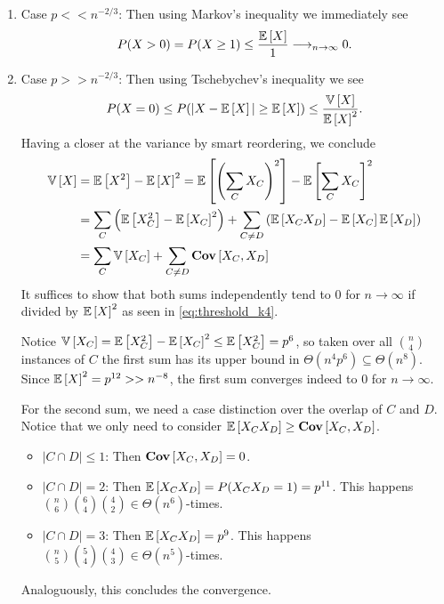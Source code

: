 \begin{enumerate}
    \item Case $p << n^{-2/3}$: Then using Markov's inequality we immediately see
          \begin{align}
              P(X > 0) = P(X \geq 1) \leq \frac{\mathbb{E}\left[X\right]}{1} \longrightarrow_{n \rightarrow \infty} 0.
          \end{align}
    \item Case $p >> n^{-2/3}$: Then using Tschebychev's inequality we see
          \begin{align}\label{eq:threshold_k4}
              P(X = 0) \leq P(|X - \mathbb{E}\left[X\right]| \geq \mathbb{E}\left[X\right]) \leq \frac{\mathbb{V}\left[X\right]}{\mathbb{E}\left[X\right]^2}.
          \end{align}
          Having a closer at the variance by smart reordering, we conclude
          \begin{align*}
              \mathbb{V}\left[X\right] & = \mathbb{E}\left[X^2\right] - \mathbb{E}\left[X\right]^2 = \mathbb{E}\left[\left(\sum_C X_C\right)^2\right] - \mathbb{E}\left[\sum_C X_C\right]^2                                         \\
                           & = \sum_C \left(\mathbb{E}\left[ X_C^2\right] - \mathbb{E}\left[X_C\right]^2 \right) + \sum_{C \neq D}\left( \mathbb{E}\left[X_CX_D\right] - \mathbb{E}\left[X_C\right] \mathbb{E}\left[X_D\right]\right) \\
                           & = \sum_C \mathbb{V}\left[X_C\right] + \sum_{C \neq D} \mathbf{Cov}\left[X_C, X_D\right]
          \end{align*}
          It suffices to show that both sums independently tend to 0 for $n \rightarrow \infty$ if divided by $\mathbb{E}\left[X\right]^2$ as seen in \eqref{eq:threshold_k4}.

          Notice $\mathbb{V}\left[X_C\right] = \mathbb{E}\left[X_C^2\right] - \mathbb{E}\left[X_C\right]^2 \leq \mathbb{E}\left[X_C^2\right] = p^6$,
          so taken over all $\binom{n}{4}$ instances of $C$ the first sum has its upper bound in $\Theta(n^4p^6) \subseteq \Theta(n^8)$.
          Since $\mathbb{E}\left[X\right]^2 = p^{12} >> n^{-8}$, the first sum converges indeed to $0$ for $n \rightarrow \infty$.

          For the second sum, we need a case distinction over the overlap of $C$ and $D$.
          Notice that we only need to consider $\mathbb{E}\left[X_CX_D\right] \geq \mathbf{Cov}\left[X_C,X_D\right]$.
          \begin{itemize}
              \item $|C \cap D| \leq 1$: Then $\mathbf{Cov}\left[X_C,X_D\right] = 0$.
              \item $|C \cap D| = 2$: Then $\mathbb{E}\left[X_CX_D\right]=P(X_CX_D = 1) = p^{11}$.
                    This happens $\binom{n}{6}\binom{6}{4}\binom{4}{2} \in \Theta(n^6)$-times.
              \item $|C \cap D| = 3$: Then $\mathbb{E}\left[X_CX_D\right]=p^{9}$.
                    This happens $\binom{n}{5}\binom{5}{4}\binom{4}{3} \in \Theta(n^5)$-times.
          \end{itemize}
          Analoguously, this concludes the convergence.
\end{enumerate}

